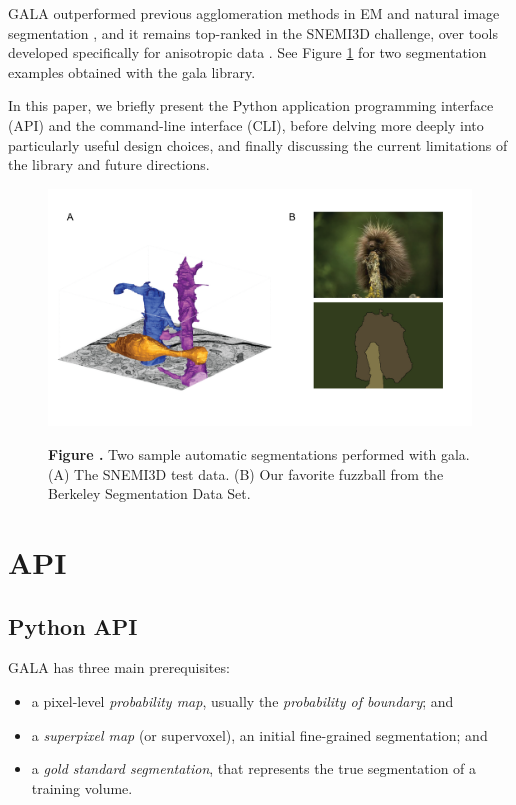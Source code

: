 \documentclass{frontiersSCNS} %
\begin{document}
GALA outperformed previous agglomeration methods in EM and natural image segmentation \citep{NunezIglesias:2013cd}, and it remains top-ranked in the SNEMI3D challenge, over tools developed specifically for anisotropic data \citep{snemi, Liu:2012ba, Kaynig:2013tv}.
See Figure \ref{fig:01} for two segmentation examples obtained with the gala library.

In this paper, we briefly present the Python application programming interface (API) and the command-line interface (CLI), before delving more deeply into particularly useful design choices, and finally discussing the current limitations of the library and future directions.


\begin{figure}
\begin{center}
\includegraphics[width=18cm]{figure1}
\end{center}
 \textbf{\label{fig:01} Figure .}{ Two sample automatic segmentations performed with gala. (A) The SNEMI3D test data. (B) Our favorite fuzzball from the Berkeley Segmentation Data Set. }
\end{figure}


\section{API}


\subsection{Python API}

GALA has three main prerequisites:
\begin{itemize}
\item a pixel-level \emph{probability map}, usually the \emph{probability of boundary}; and
\item a \emph{superpixel map} (or supervoxel), an initial fine-grained segmentation; and
\item a \emph{gold standard segmentation}, that represents the true segmentation of a training volume.
\end{itemize}
\end{document}
